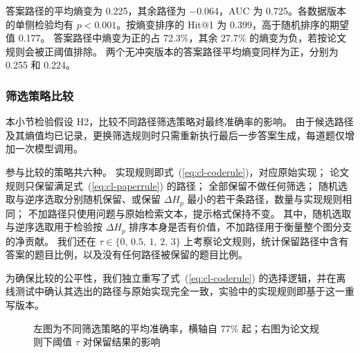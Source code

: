 答案路径的平均熵变为 0.225，其余路径为 $-$0.064，AUC 为 0.725。各数据版本的单侧检验均有 $p<0.001$。按熵变排序的 Hit@1 为 0.399，高于随机排序的期望值 0.177。
答案路径中熵变为正的占 72.3\%，其余 27.7\% 的熵变为负，若按论文规则会被正阈值排除。
两个无冲突版本的答案路径平均熵变同样为正，分别为 0.255 和 0.224。

\subsubsection{筛选策略比较}
\label{sec:cl-e2}

本小节检验假设 H2，比较不同路径筛选策略对最终准确率的影响。
由于候选路径及其熵值均已记录，更换筛选规则时只需重新执行最后一步答案生成，每道题仅增加一次模型调用。

参与比较的策略共六种。
实现规则即式~(\ref{eq:cl-coderule})，对应原始实现；
论文规则只保留满足式~(\ref{eq:cl-paperrule}) 的路径；
全部保留不做任何筛选；
随机选取与逆序选取分别随机保留、或保留 $\Delta H_p$ 最小的若干条路径，数量与实现规则相同；
不加路径只使用问题与原始检索文本，提示格式保持不变。
其中，随机选取与逆序选取用于检验按 $\Delta H_p$ 排序本身是否有价值，不加路径用于衡量整个图分支的净贡献。
我们还在 $\tau\in\{0,\,0.5,\,1,\,2,\,3\}$ 上考察论文规则，统计保留路径中含有答案的题目比例，以及没有任何路径被保留的题目比例。

为确保比较的公平性，我们独立重写了式~(\ref{eq:cl-coderule}) 的选择逻辑，并在离线测试中确认其选出的路径与原始实现完全一致，实验中的实现规则即基于这一重写版本。

\begin{figure}[htbp]
  \centering
  \begin{minipage}[t]{0.48\textwidth}\centering
  \end{minipage}\hfill
  \begin{minipage}[t]{0.48\textwidth}\centering
  \end{minipage}
  \caption{左图为不同筛选策略的平均准确率，横轴自 77\% 起；右图为论文规则下阈值 $\tau$ 对保留结果的影响}
  \label{fig:cl-e2}
\end{figure}

